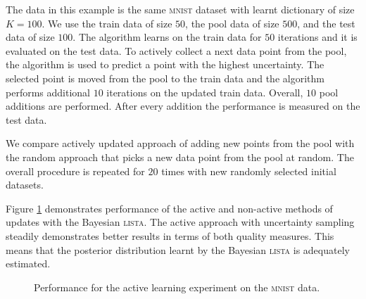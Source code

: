 \documentclass[letterpaper]{article}
\begin{document}
The data in this example is the same \textsc{mnist} dataset with learnt dictionary of size $K=100$. We use the train data of size $50$, the pool data of size $500$,  and the test data of size $100$. The algorithm learns on the train data for $50$ iterations and it is evaluated on the test data. To actively collect a next data point from the pool, the algorithm is used to predict a point with the highest uncertainty. The selected point is moved from the pool to the train data and the algorithm performs additional $10$ iterations on the updated train data. Overall, $10$ pool additions are performed. After every addition the performance is measured on the test data.

We compare actively updated approach of adding new points from the pool with the random approach that picks a new data point from the pool at random. The overall procedure is repeated for $20$ times with new randomly selected initial datasets.

Figure \ref{fig:active_learning_mnist} demonstrates performance of the active and non-active methods of updates with the Bayesian \textsc{lista}. The active approach with uncertainty sampling steadily demonstrates better results in terms of both quality measures. This means that the posterior distribution learnt by the Bayesian \textsc{lista} is adequately estimated.
\begin{figure}[t]
\centering
{}%
\caption{Performance for the active learning experiment on the \textsc{mnist} data. }
\label{fig:active_learning_mnist}
\end{figure}
\end{document}
